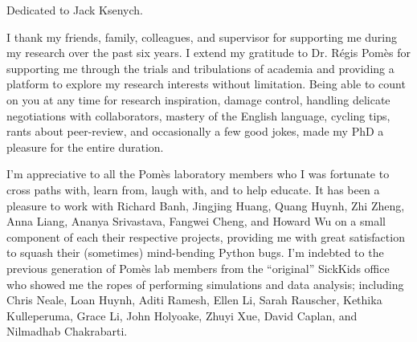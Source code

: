 \documentclass[doublespaced]{ut-thesis}
\begin{document}
\begin{preliminary}
\begin{abstract}

\end{abstract}


\begin{dedication}
Dedicated to Jack Ksenych.
\end{dedication}

\newpage  %


\begin{acknowledgements}
I thank my friends, family, colleagues, and supervisor for supporting me during my research over the past six years. I extend my gratitude to Dr. R\'egis Pom\`es for supporting me through the trials and tribulations of academia and providing a platform to explore my research interests without limitation. Being able to count on you at any time for research inspiration, damage control, handling delicate negotiations with collaborators, mastery of the English language, cycling tips, rants about peer-review, and occasionally a few good jokes, made my PhD a pleasure for the entire duration.

I'm appreciative to all the Pom\`es laboratory members who I was fortunate to cross paths with, learn from, laugh with, and to help educate. It has been a pleasure to work with Richard Banh, Jingjing Huang, Quang Huynh, Zhi Zheng, Anna Liang, Ananya Srivastava, Fangwei Cheng, and Howard Wu on a small component of each their respective projects, providing me with great satisfaction to squash their (sometimes) mind-bending Python bugs. I'm indebted to the previous generation of  Pom\`es lab members from the ``original'' SickKids office who showed me the ropes of performing simulations and data analysis; including Chris Neale, Loan Huynh, Aditi Ramesh, Ellen Li, Sarah Rauscher, Kethika Kulleperuma, Grace Li, John Holyoake, Zhuyi Xue, David Caplan, and Nilmadhab Chakrabarti. 


\end{acknowledgements}
\end{preliminary}
\end{document}

